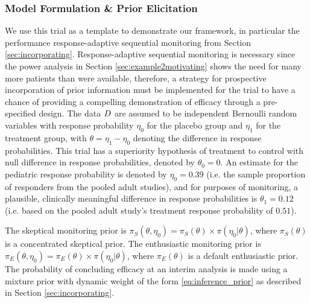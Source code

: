 \documentclass[AMA,STIX1COL,doublespace]{WileyNJD-v2}
\begin{document}
\subsubsection{Model Formulation \& Prior Elicitation}\label{sec:example2model}
We use this trial as a template to demonstrate our framework, in particular the performance response-adaptive sequential monitoring from Section \ref{sec:incorporating}. Response-adaptive sequential monitoring is necessary since the power analysis in Section \ref{sec:example2motivating} shows the need for many more patients than were available, therefore, a strategy for prospective incorporation of prior information must be implemented for the trial to have a chance of providing a compelling demonstration of efficacy through a pre-specified design.
%
The data $\boldmath{D}$ are assumed to be independent Bernoulli random variables with response probability $\eta_0$ for the placebo group and $\eta_1$ for the treatment group, with $\theta=\eta_1-\eta_0$ denoting the difference in response probabilities. 
%
This trial has a superiority hypothesis of treatment to control with null difference in response probabilities, denoted by $\theta_0=0$.
%
An estimate for the pediatric response probability is denoted by $\eta_0=0.39$ (i.e. the sample proportion of responders from the pooled adult studies), and for purposes of monitoring, a plausible, clinically meaningful difference in response probabilities is $\theta_1=0.12$ (i.e. based on the pooled adult study's treatment response probability of $0.51$).%
%

The skeptical monitoring prior is $\pi_S(\theta,\eta_0)=\pi_S(\theta)\times\pi(\eta_0|\theta)$, where $\pi_S(\theta)$ is a concentrated skeptical prior.
%
The enthusiastic monitoring prior is $\pi_E(\theta,\eta_0)=\pi_E(\theta)\times\pi(\eta_0|\theta)$, where $\pi_E(\theta)$ is a default enthusiastic prior.
%
The probability of concluding efficacy at an interim analysis is made using a mixture prior with dynamic weight of the form \eqref{eq:inference_prior} as described in Section \ref{sec:incorporating}.
%
%
%
\end{document}
